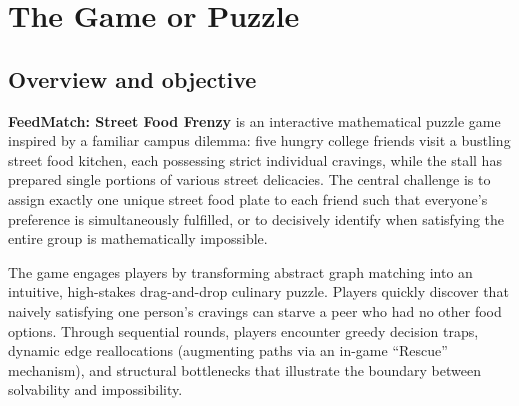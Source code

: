 \documentclass[11pt,a4paper]{article}
\begin{document}
\vspace{10pt}

\newpage
\section{The Game or Puzzle}

\subsection{Overview and objective}
\textbf{FeedMatch: Street Food Frenzy} is an interactive mathematical puzzle game inspired by a familiar campus dilemma: five hungry college friends visit a bustling street food kitchen, each possessing strict individual cravings, while the stall has prepared single portions of various street delicacies. The central challenge is to assign exactly one unique street food plate to each friend such that everyone's preference is simultaneously fulfilled, or to decisively identify when satisfying the entire group is mathematically impossible. 

The game engages players by transforming abstract graph matching into an intuitive, high-stakes drag-and-drop culinary puzzle. Players quickly discover that naively satisfying one person's cravings can starve a peer who had no other food options. Through sequential rounds, players encounter greedy decision traps, dynamic edge reallocations (augmenting paths via an in-game ``Rescue'' mechanism), and structural bottlenecks that illustrate the boundary between solvability and impossibility.
\end{document}
